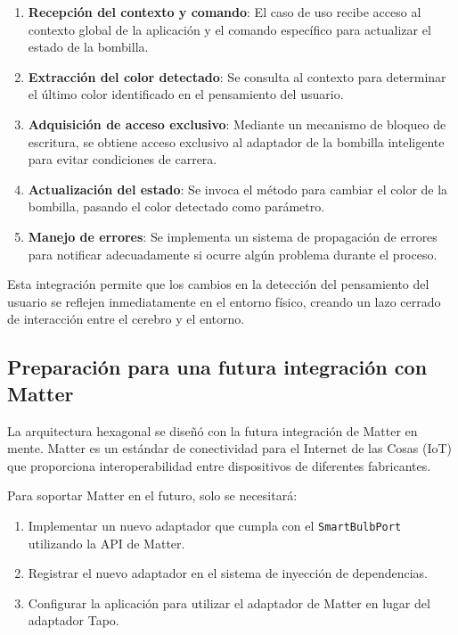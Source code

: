 \begin{enumerate}
    \item \textbf{Recepción del contexto y comando}: El caso de uso recibe acceso al contexto global de la aplicación y el comando específico para actualizar el estado de la bombilla.
    
    \item \textbf{Extracción del color detectado}: Se consulta al contexto para determinar el último color identificado en el pensamiento del usuario.
    
    \item \textbf{Adquisición de acceso exclusivo}: Mediante un mecanismo de bloqueo de escritura, se obtiene acceso exclusivo al adaptador de la bombilla inteligente para evitar condiciones de carrera.
    
    \item \textbf{Actualización del estado}: Se invoca el método para cambiar el color de la bombilla, pasando el color detectado como parámetro.
    
    \item \textbf{Manejo de errores}: Se implementa un sistema de propagación de errores para notificar adecuadamente si ocurre algún problema durante el proceso.
\end{enumerate}

Esta integración permite que los cambios en la detección del pensamiento del usuario se reflejen inmediatamente en el entorno físico, creando un lazo cerrado de interacción entre el cerebro y el entorno.

\subsection{Preparación para una futura integración con Matter}

La arquitectura hexagonal se diseñó con la futura integración de Matter en mente. Matter es un estándar de conectividad para el Internet de las Cosas (IoT) que proporciona interoperabilidad entre dispositivos de diferentes fabricantes.

Para soportar Matter en el futuro, solo se necesitará:

\begin{enumerate}
    \item Implementar un nuevo adaptador que cumpla con el \texttt{SmartBulbPort} utilizando la API de Matter.
    \item Registrar el nuevo adaptador en el sistema de inyección de dependencias.
    \item Configurar la aplicación para utilizar el adaptador de Matter en lugar del adaptador Tapo.
\end{enumerate}

